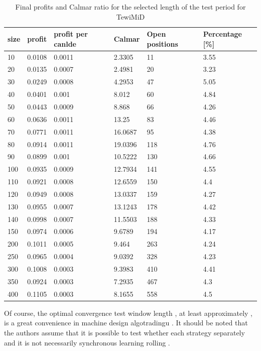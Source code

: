 \documentclass{tewiart}
\begin{document}
\begin{table}[h!]
\caption{Final profits and Calmar ratio for the selected length of the test period for TewiMiD}
\label{table2}
 \begin{tabular}{|l|l|l|l|l|l|} 
 \hline size & profit & profit per canlde & Calmar & Open positions & Percentage [\%]\\ \hline  
10 & 0.0108 & 0.0011 & 2.3305 & 11 & 3.55 \\ 
 20 & 0.0135 & 0.0007 & 2.4981 & 20 & 3.23 \\ 
 30 & 0.0249 & 0.0008 & 4.2953 & 47 & 5.05 \\ 
 40 & 0.0401 & 0.001 & 8.012 & 60 & 4.84 \\ 
 50 & 0.0443 & 0.0009 & 8.868 & 66 & 4.26 \\ 
 60 & 0.0636 & 0.0011 & 13.25 & 83 & 4.46 \\ 
 70 & 0.0771 & 0.0011 & 16.0687 & 95 & 4.38 \\ 
 80 & 0.0914 & 0.0011 & 19.0396 & 118 & 4.76 \\ 
 90 & 0.0899 & 0.001 & 10.5222 & 130 & 4.66 \\ 
 100 & 0.0935 & 0.0009 & 12.7934 & 141 & 4.55 \\ 
 110 & 0.0921 & 0.0008 & 12.6559 & 150 & 4.4 \\ 
 120 & 0.0949 & 0.0008 & 13.0337 & 159 & 4.27 \\ 
 130 & 0.0955 & 0.0007 & 13.1243 & 178 & 4.42 \\ 
 140 & 0.0998 & 0.0007 & 11.5503 & 188 & 4.33 \\ 
 150 & 0.0974 & 0.0006 & 9.6789 & 194 & 4.17 \\ 
 200 & 0.1011 & 0.0005 & 9.464 & 263 & 4.24 \\ 
 250 & 0.0965 & 0.0004 & 9.0392 & 328 & 4.23 \\ 
 300 & 0.1008 & 0.0003 & 9.3983 & 410 & 4.41 \\ 
 350 & 0.0924 & 0.0003 & 7.2935 & 467 & 4.3 \\ 
 400 & 0.1105 & 0.0003 & 8.1655 & 558 & 4.5 \\ 
 \hline \end{tabular} 
 \end{table}
 \FloatBarrier
 
Of course, the optimal convergence test window length , at least approximately , is a great convenience in machine design algotradingu . It should be noted that the authors assume that it is possible to test whether each strategy separately and it is not necessarily synchronous learning rolling .\\
\end{document}
